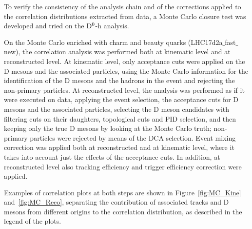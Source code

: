 \label{MCclosure}
To verify the consistency of the analysis chain and of the corrections applied to the  correlation distributions extracted from data, a Monte Carlo closure test was developed and tried on the ${\rm D^0}$-h analysis.

On the Monte Carlo enriched with charm and beauty quarks (LHC17d2a$\_$fast$\_$new), the correlation analysis was performed both at kinematic level and at reconstructed level. At kinematic level, only acceptance cuts were applied on the D mesons and the associated particles, using the Monte Carlo information for the identification of the D mesons and the hadrons in the event and rejecting the non-primary particles. At reconstructed level, the analysis was performed as if it were executed on data, applying the event selection, the acceptance cuts for D mesons and the associated particles, selecting the D meson candidates with filtering cuts on their daughters, topological cuts and PID selection, and then keeping only the true D mesons by looking at the Monte Carlo truth; non-primary particles were rejected by means of the DCA selection. Event mixing correction was applied both at reconstructed and at kinematic level, where it takes into account just the effects of the acceptance cuts. In addition, at reconstructed level also tracking efficiency and trigger efficiency correction were applied.

Examples of correlation plots at both steps are shown in Figure~\ref{fig:MC_Kine} and~\ref{fig:MC_Reco}, separating the contribution of associated tracks and D mesons from different origins to the correlation distribution, as described in the legend of the plots.

